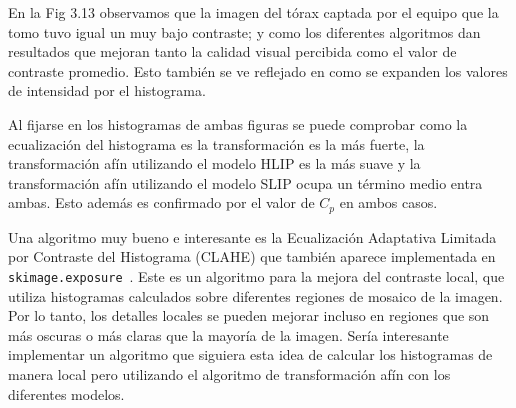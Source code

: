 En la Fig 3.13 observamos que la imagen del t\'orax captada por el equipo que la tomo tuvo igual un muy bajo contraste; y como los diferentes algoritmos dan resultados que mejoran tanto la calidad visual percibida como el valor de contraste promedio. Esto tambi\'en se ve reflejado en como se expanden los valores de intensidad por el histograma.

Al fijarse en los histogramas de ambas figuras se puede comprobar como la ecualizaci\'on del histograma es la transformaci\'on es la m\'as fuerte, la transformaci\'on af\'in utilizando el modelo HLIP es la m\'as suave y la transformaci\'on af\'in utilizando el modelo SLIP ocupa un t\'ermino medio entra ambas. Esto adem\'as es confirmado por el valor de $C_p$ en ambos casos.

Una algoritmo muy bueno e interesante es la Ecualización Adaptativa Limitada por Contraste del Histograma (CLAHE) que tambi\'en aparece implementada en \verb|skimage.exposure|~\cite{module_exposure}. Este es un algoritmo para la mejora del contraste local, que utiliza histogramas calculados sobre diferentes regiones de mosaico de la imagen. Por lo tanto, los detalles locales se pueden mejorar incluso en regiones que son más oscuras o más claras que la mayoría de la imagen. Ser\'ia interesante implementar un algoritmo que siguiera esta idea de calcular los histogramas de manera local pero utilizando el algoritmo de transformaci\'on af\'in con los diferentes modelos.